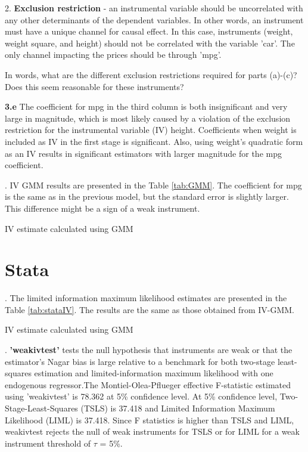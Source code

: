 \documentclass{article}
\begin{document}
2. \textbf{Exclusion restriction} - an instrumental variable should be uncorrelated with any other determinants of the dependent variables. In other words, an instrument must have a unique channel for causal effect. In this case, instruments (weight, weight square, and height) should not be correlated with the variable 'car'. The only channel impacting the prices should be through 'mpg'.

In words, what are the different exclusion restrictions required for parts (a)-(c)? Does this seem reasonable for these instruments?


\noindent \textbf{3.e }The coefficient for mpg in the third column is both insignificant and very large in magnitude, which is most likely caused by a violation of the exclusion restriction for the instrumental variable (IV) height. Coefficients when weight is included as IV in the first stage is significant. Also, using weight's quadratic form as an IV results in significant estimators with larger magnitude for the mpg coefficient. 

. IV GMM results are presented in the Table \ref{tab:GMM}. The coefficient for mpg is the same as in the previous model, but the standard error is slightly larger. This difference might be a sign of a weak instrument.

\begin{table}[h]
    \centering
    
    \caption{IV estimate calculated using GMM}
    \label{tab:GMM}
\end{table}

\clearpage

\section{Stata}

. The limited information maximum likelihood estimates are presented in the Table \ref{tab:stataIV}. The results are the same as those obtained from IV-GMM. 

\begin{table}[h]
    \centering
    
    \caption{IV estimate calculated using GMM}
    \label{tab:stataIV}
\end{table}


. \textbf{'weakivtest'} tests the null hypothesis that instruments are weak or that the estimator’s Nagar bias is large relative to a benchmark for both two-stage least-squares estimation and limited-information maximum likelihood with one endogenous regressor.The Montiel-Olea-Pflueger effective F-statistic estimated using 'weakivtest' is 78.362 at 5\% confidence level. At 5\% confidence level, Two-Stage-Least-Squares (TSLS) is 37.418 and Limited Information Maximum Likelihood (LIML) is 37.418. Since F statistics is higher than TSLS and LIML, weakivtest rejects the null of weak instruments for TSLS or for LIML for a weak instrument threshold of $\tau$ = 5\%. 
\end{document}
